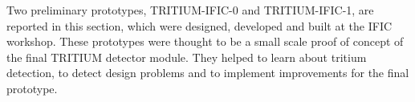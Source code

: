 Two preliminary prototypes, TRITIUM-IFIC-0 and TRITIUM-IFIC-1, are reported in this section, which were designed, developed and built at the IFIC workshop. These prototypes were thought to be a small scale proof of concept  of the final TRITIUM detector module. They helped to learn about tritium detection, to detect design problems and to implement improvements for the final prototype.